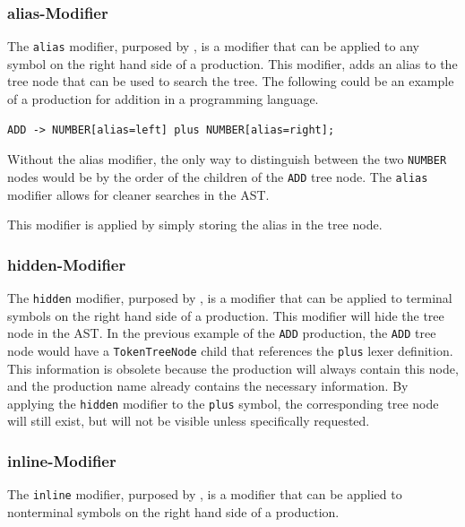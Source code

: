 \subsubsection{alias-Modifier}

The \verb|alias| modifier, purposed by \cite{GeneratingRewritableAST}, is a modifier that can be applied to any symbol on the right hand side of a production. 
This modifier, adds an alias to the tree node that can be used to search the tree. 
The following could be an example of a production for addition in a programming language.

\begin{verbatim}
ADD -> NUMBER[alias=left] plus NUMBER[alias=right];
\end{verbatim}

Without the alias modifier, the only way to distinguish between the two \verb|NUMBER| nodes would be by the order of the children of the \verb|ADD| tree node. 
The \verb|alias| modifier allows for cleaner searches in the AST.

This modifier is applied by simply storing the alias in the tree node.


\subsubsection{hidden-Modifier}

The \verb|hidden| modifier, purposed by \cite{GeneratingRewritableAST}, is a modifier that can be applied to terminal symbols on the right hand side of a production.
This modifier will hide the tree node in the AST. 
In the previous example of the \verb|ADD| production, the \verb|ADD| tree node would have a \verb|TokenTreeNode| child that references the \verb|plus| lexer definition. 
This information is obsolete because the production will always contain this node, and the production name already contains the necessary information. 
By applying the \verb|hidden| modifier to the \verb|plus| symbol, the corresponding tree node will still exist, but will not be visible unless specifically requested.

\subsubsection{inline-Modifier}

The \verb|inline| modifier, purposed by \cite{GeneratingRewritableAST}, is a modifier that can be applied to nonterminal symbols on the right hand side of a production. 


